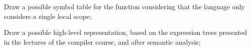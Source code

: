 \documentclass[docid=2020]{comp_test1}
\begin{document}
\question
Draw a possible symbol table for the function considering that the language only considers a single local scope;

\ansseparator

\begin{center}
\end{center}

\question
Draw a possible high-level representation, based on the expression trees presented in the lectures of the compiler course, and after semantic analysis;

\ansseparator
\end{document}
